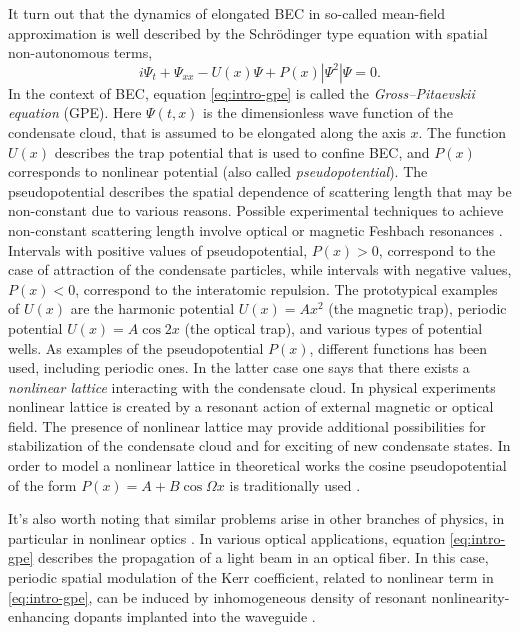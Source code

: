 It turn out that the dynamics of elongated BEC in so-called mean-field approximation is well described by the Schr\"odinger type equation with spatial non-autonomous terms,
\begin{equation}
	i \Psi_t + \Psi_{xx} - U(x) \Psi + P(x) |\Psi^2| \Psi = 0.
\label{eq:intro-gpe}
\end{equation}
In the context of BEC, equation \eqref{eq:intro-gpe} is called the {\it Gross--Pitaevskii equation} (GPE).
Here $\Psi(t, x)$ is the dimensionless wave function of the condensate cloud, that is assumed to be elongated along the axis $x$.
The function $U(x)$ describes the trap potential that is used to confine BEC, and $P(x)$ corresponds to nonlinear potential (also called {\it pseudopotential}).
The pseudopotential describes the spatial dependence of scattering length that may be non-constant due to various reasons.
Possible experimental techniques to achieve non-constant scattering length involve optical or magnetic Feshbach resonances \cite{PollackDriesJunkerChenCorcovilosHulet, ChinGrimmJulienneTsienga, BauerLetterVoRempeDurr}.
Intervals with positive values of pseudopotential, $P(x) > 0$, correspond to the case of attraction of the condensate particles, while intervals with negative values, $P(x) < 0$, correspond to the interatomic repulsion.
The prototypical examples of $U(x)$ are the harmonic potential $U(x) = Ax^2$ (the magnetic trap), periodic potential $U(x) = A \cos 2x$ (the optical trap), and various types of potential wells.
As examples of the pseudopotential $P(x)$, different functions has been used, including periodic ones.
In the latter case one says that there exists a {\it nonlinear lattice} interacting with the condensate cloud.
In physical experiments nonlinear lattice is created by a resonant action of external magnetic \cite{InouyeAndrewsStengerMiesnerStamperKurnKetterle} or optical \cite{ClarkHaXuChin} field.
The presence of nonlinear lattice may provide additional possibilities for stabilization of the condensate cloud and for exciting of new condensate states.
In order to model a nonlinear lattice in theoretical works the cosine pseudopotential of the form $P(x) = A + B \cos \Omega x$ is traditionally used \cite{SakaguchiMalomed}.

It's also worth noting that similar problems arise in other branches of physics, in particular in nonlinear optics \cite{KartashovMalomedTorner}.
In various optical applications, equation \eqref{eq:intro-gpe} describes the propagation of a light beam in an optical fiber.
In this case, periodic spatial modulation of the Kerr coefficient, related to nonlinear term in \eqref{eq:intro-gpe}, can be induced by inhomogeneous density of resonant nonlinearity-enhancing dopants implanted into the waveguide \cite{HukriedeRundeKip}.

